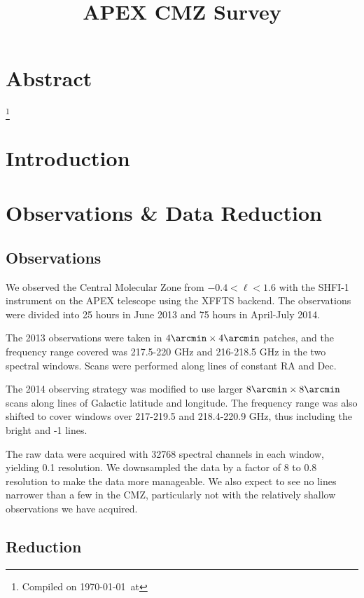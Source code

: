 

\title{APEX CMZ Survey}


\section{Abstract}

\footnote{Compiled on \today\ at \currenttime}


\section{Introduction}




\section{Observations \& Data Reduction}

\subsection{Observations}
We observed the Central Molecular Zone from $-0.4 < \ell < 1.6$ with the SHFI-1
instrument \citep{Vassilev2008a} on the APEX telescope using the XFFTS backend.
The observations were divided into 25 hours in June 2013 and 75 hours in
April-July 2014.  

The 2013 observations were taken in $4\arcmin \times 4\arcmin$ patches, and the
frequency range covered was 217.5-220 GHz and 216-218.5 GHz in the two spectral
windows.  Scans were performed along lines of constant RA and Dec.

The 2014 observing strategy was modified to use larger $8\arcmin \times
8\arcmin$ scans along lines of Galactic latitude and longitude.  The frequency
range was also shifted to cover windows over 217-219.5 and 218.4-220.9 GHz, thus
including the bright \thirteenco and -1 lines.

The raw data were acquired with 32768 spectral channels in each window, yielding
0.1 \kms resolution.  We downsampled the data by a factor of 8 to 0.8 \kms
resolution to make the data more manageable.  We also expect to see no lines
narrower than a few \kms in the CMZ, particularly not with the relatively
shallow observations we have acquired.

\subsection{Reduction}
